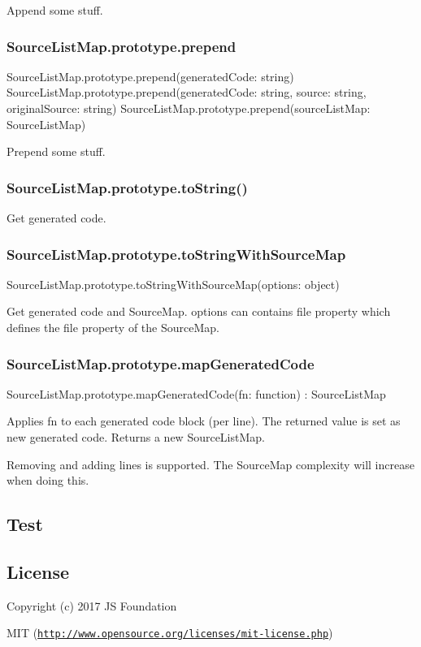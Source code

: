 Append some stuff.

\subsubsection*{{\ttfamily Source\+List\+Map.\+prototype.\+prepend}}


\begin{DoxyCode}
SourceListMap.prototype.prepend(generatedCode: string)
SourceListMap.prototype.prepend(generatedCode: string, source: string, originalSource: string)
SourceListMap.prototype.prepend(sourceListMap: SourceListMap)
\end{DoxyCode}


Prepend some stuff.

\subsubsection*{{\ttfamily Source\+List\+Map.\+prototype.\+to\+String()}}

Get generated code.

\subsubsection*{{\ttfamily Source\+List\+Map.\+prototype.\+to\+String\+With\+Source\+Map}}


\begin{DoxyCode}
SourceListMap.prototype.toStringWithSourceMap(options: object)
\end{DoxyCode}


Get generated code and Source\+Map. {\ttfamily options} can contains {\ttfamily file} property which defines the {\ttfamily file} property of the Source\+Map.

\subsubsection*{{\ttfamily Source\+List\+Map.\+prototype.\+map\+Generated\+Code}}


\begin{DoxyCode}
SourceListMap.prototype.mapGeneratedCode(fn: function) : SourceListMap
\end{DoxyCode}


Applies {\ttfamily fn} to each generated code block (per line). The returned value is set as new generated code. Returns a new Source\+List\+Map.

Removing and adding lines is supported. The Source\+Map complexity will increase when doing this.

\subsection*{Test}

\href{https://travis-ci.org/webpack/source-list-map}{\tt }

\subsection*{License}

Copyright (c) 2017 JS Foundation

M\+IT (\href{http://www.opensource.org/licenses/mit-license.php}{\tt http\+://www.\+opensource.\+org/licenses/mit-\/license.\+php}) 